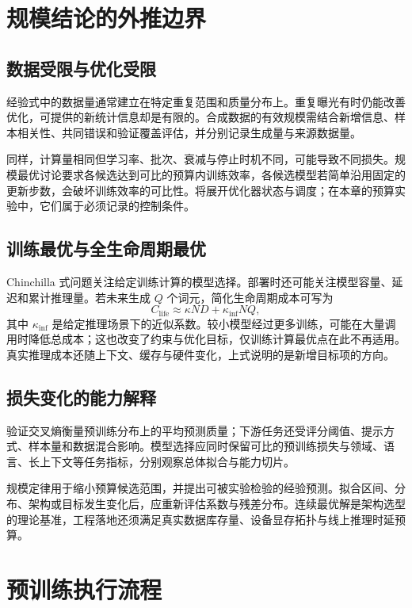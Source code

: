 \documentclass[../textbook.tex]{subfiles}
\begin{document}
\section{规模结论的外推边界}

\subsection{数据受限与优化受限}
经验式中的数据量通常建立在特定重复范围和质量分布上。重复曝光有时仍能改善优化，可提供的新统计信息却是有限的。合成数据的有效规模需结合新增信息、样本相关性、共同错误和验证覆盖评估，并分别记录生成量与来源数据量。

同样，计算量相同但学习率、批次、衰减与停止时机不同，可能导致不同损失。规模最优讨论要求各候选达到可比的预算内训练效率，各候选模型若简单沿用固定的更新步数，会破坏训练效率的可比性。将展开优化器状态与调度；在本章的预算实验中，它们属于必须记录的控制条件。

\subsection{训练最优与全生命周期最优}
Chinchilla 式问题关注给定训练计算的模型选择。部署时还可能关注模型容量、延迟和累计推理量。若未来生成 $Q$ 个词元，简化生命周期成本可写为
\begin{equation}
 C_{\mathrm{life}}\approx\kappa ND+\kappa_{\mathrm{inf}}NQ,
\end{equation}
其中 $\kappa_{\mathrm{inf}}$ 是给定推理场景下的近似系数。较小模型经过更多训练，可能在大量调用时降低总成本；这也改变了约束与优化目标，仅训练计算最优点在此不再适用。真实推理成本还随上下文、缓存与硬件变化，上式说明的是新增目标项的方向。

\subsection{损失变化的能力解释}
验证交叉熵衡量预训练分布上的平均预测质量；下游任务还受评分阈值、提示方式、样本量和数据混合影响。模型选择应同时保留可比的预训练损失与领域、语言、长上下文等任务指标，分别观察总体拟合与能力切片。

\begin{note}[规模定律的工程约束与适用边界]
规模定律用于缩小预算候选范围，并提出可被实验检验的经验预测。拟合区间、分布、架构或目标发生变化后，应重新评估系数与残差分布。连续最优解是架构选型的理论基准，工程落地还须满足真实数据库存量、设备显存拓扑与线上推理时延预算。
\end{note}

\section{预训练执行流程}
\end{document}
